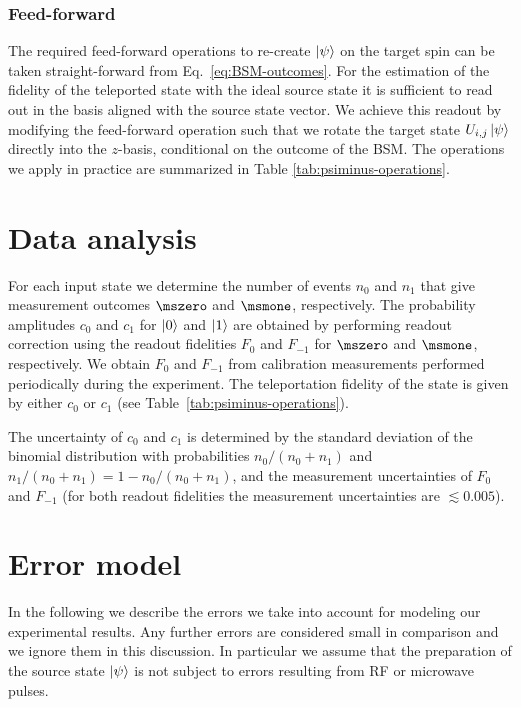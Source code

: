 \subsubsection{Feed-forward}
The required feed-forward operations to re-create $\left|\psi\right>$ on the target spin can be taken straight-forward from Eq.~\ref{eq:BSM-outcomes}. For the estimation of the fidelity of the teleported state with the ideal source state it is sufficient to read out in the basis aligned with the source state vector. We achieve this readout by modifying the feed-forward operation such that we rotate the target state $U_{i,j}\left|\psi\right>$ directly into the $z$-basis, conditional on the outcome of the BSM. The operations we apply in practice are summarized in Table \ref{tab:psiminus-operations}.

\section{Data analysis}

For each input state we determine the number of events $n_{0}$ and $n_{1}$ that give measurement outcomes $\mszero$ and $\msmone$, respectively. The probability amplitudes $c_0$ and $c_{1}$ for $\left|0\right>$ and $\left|1\right>$ are obtained by performing readout correction using the readout fidelities $F_0$ and $F_{-1}$ for $\mszero$ and $\msmone$, respectively. We obtain $F_0$ and $F_{-1}$ from calibration measurements performed periodically during the experiment. The teleportation fidelity of the state is given by either $c_0$ or $c_{1}$ (see Table~\ref{tab:psiminus-operations}).

The uncertainty of $c_0$ and $c_1$ is determined by the standard deviation of the binomial distribution with probabilities $n_0/(n_0 + n_1)$ and $n_1/(n_0 + n_1) = 1 - n_0/(n_0 + n_1)$, and the measurement uncertainties of $F_0$ and $F_{-1}$ (for both readout fidelities the measurement uncertainties are $\lesssim 0.005$).

\section{Error model}

In the following we describe the errors we take into account for modeling our experimental results. Any further errors are considered small in comparison and we ignore them in this discussion. In particular we assume that the preparation of the source state $\left|\psi\right>$ is not subject to errors resulting from RF or microwave pulses.

